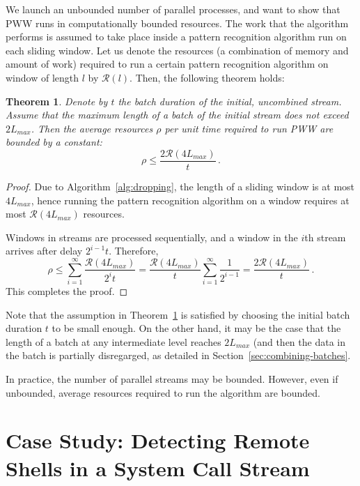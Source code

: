\documentclass[runningheads,a4paper]{llncs}
\newtheorem{thm}{Theorem}
\begin{document}
We launch an unbounded number of parallel processes, and want to show
that PWW runs in computationally bounded resources. The work that
the algorithm performs is assumed to take place inside a pattern
recognition algorithm run on each sliding window. Let us denote
the resources (a combination of memory and amount of work)
required to run a certain pattern recognition algorithm on
window of length $l$ by $\mathcal{R}(l)$. Then, the following
theorem holds:
\begin{thm}
    \label{thm:complexity}
    Denote by $t$ the batch duration of the initial, uncombined
    stream. Assume that the maximum length of a batch of the initial
    stream does not exceed $2L_{max}$. Then the average resources
    $\rho$ per unit time required to run PWW are bounded by a constant:
    \begin{equation}
        \rho \le \frac {2\mathcal{R}(4L_{max})} t\,.
		\label{eqn:rho}
    \end{equation}
\end{thm}
\begin{proof}
    Due to Algorithm~\ref{alg:dropping}, the length of a sliding window
	is at most $4L_{max}$, hence running the pattern recognition
    algorithm on a window requires at most $\mathcal{R}(4L_{max})$
    resources.

    Windows in streams are processed sequentially, and a window in the
	$i$th stream arrives after delay $2^{i-1}t$. Therefore, 
    \begin{equation}
        \rho \le \sum_{i=1}^{\infty} \frac {\mathcal{R}(4L_{max})} {2^it}
			   = \frac {\mathcal{R}(4L_{max})} t \sum_{i=1}^\infty \frac 1 {2^{i-1}}
               = \frac {2\mathcal{R}(4L_{max})} t\,.
    \end{equation}
    This completes the proof.
\end{proof}
Note that the assumption in Theorem~\ref{thm:complexity} is 
satisfied by choosing the initial batch duration $t$ to be small
enough. On the other hand, it may be the case that the length
of a batch at any intermediate level reaches $2L_{max}$ (and
then the data in the batch is partially disregarged, as detailed
in Section~\ref{sec:combining-batches}.

In practice, the number of parallel streams may be bounded.
However, even if unbounded, average resources required to run
the algorithm are bounded.

\section{Case Study: Detecting Remote Shells in a System Call Stream}
\label{sec:case-studies}
\end{document}
